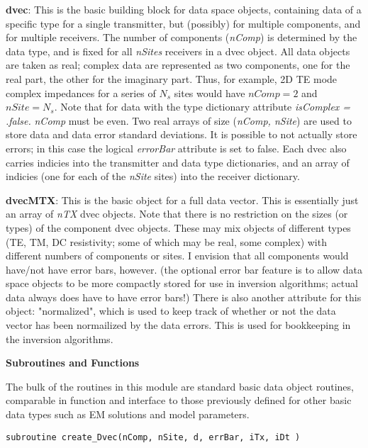 \documentclass[12pt]{article}
\begin{document}
\noindent
{\bf dvec}:  This is the basic building block for data space objects,
containing data of a specific type for a single transmitter, but 
(possibly) for multiple components, and for multiple receivers.  
The number of components ({\it nComp}) is determined by the data type, and is
fixed for all {\it nSites} receivers in a dvec object.  
All data objects are
taken as real; complex data are represented as two components,
one for the real part, the other for the imaginary part.
Thus, for example, 2D TE mode complex impedances for a series 
of $N_s$ sites would have $nComp = 2$ and $nSite = N_s$.  Note
that for data with the type dictionary attribute 
{\it isComplex = .false.} {\it nComp} must be even.
Two real arrays of size ({\it nComp, nSite}) are used to store data
and data error standard deviations.  It is possible to not actually
store errors; in this case the logical {\it errorBar} attribute
is set to false.  Each dvec also carries indicies into
the transmitter and data type dictionaries, and an array of indicies
(one for each of the {\it nSite} sites) into the receiver dictionary.

{\bf dvecMTX}:  This is the basic object for a full data vector.
This is essentially just an array of {\it nTX} dvec objects.
Note that there is no restriction on the sizes (or types) of the component
dvec objects.  These may mix objects of different types
(TE, TM, DC resistivity; some of which may be real, some complex)
with different numbers of components or sites.  I
envision that all components would have/not have error bars, however.
(the optional error bar feature is to allow data space objects to
be more compactly stored for use in inversion algorithms; actual
data always does have to have error bars!) There is also another 
attribute for this object: "normalized", which is used to keep
track of whether or not the data vector has been normailized by
the data errors.  This is used for bookkeeping in the inversion algorithms.

\vspace{10pt}

\noindent
{\bf Subroutines and Functions}

\vspace{6pt}

The bulk of the routines in this module are standard basic data object
routines, comparable in function and interface to those previously
defined for other basic data types such as EM solutions and model
parameters.

\begin{verbatim}
subroutine create_Dvec(nComp, nSite, d, errBar, iTx, iDt )
\end{verbatim}
\end{document}

